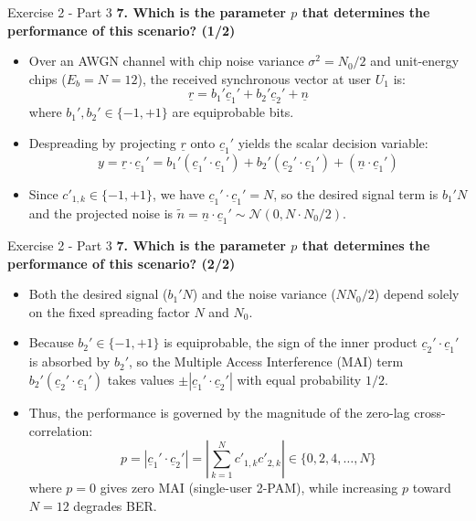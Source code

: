 \documentclass[10pt, aspectratio=169]{beamer}
\newcommand{\question}[1]{{\color{QuestionRed}\textbf{#1}}}
\begin{document}
	\begin{frame}{Exercise 2 - Part 3}
		\question{7. Which is the parameter $p$ that determines the performance of this scenario? (1/2)}
		
		\vspace{0.1cm}
		\begin{itemize}
			\item Over an AWGN channel with chip noise variance $\sigma^2 = N_0/2$ and unit-energy chips ($E_b = N = 12$), the received synchronous vector at user $U_1$ is:
			\[
			\underline{r} = b_1'\underline{c}_1' + b_2'\underline{c}_2' + \underline{n}
			\]
			where $b_1', b_2' \in \{-1, +1\}$ are equiprobable bits.
			\item Despreading by projecting $\underline{r}$ onto $\underline{c}_1'$ yields the scalar decision variable:
			\[
			y = \underline{r} \cdot \underline{c}_1' = b_1'(\underline{c}_1' \cdot \underline{c}_1') + b_2'(\underline{c}_2' \cdot \underline{c}_1') + (\underline{n} \cdot \underline{c}_1')
			\]
			\item Since $c'_{1,k} \in \{-1, +1\}$, we have $\underline{c}_1' \cdot \underline{c}_1' = N$, so the desired signal term is $b_1'N$ and the projected noise is $\tilde{n} = \underline{n} \cdot \underline{c}_1' \sim \mathcal{N}(0, N \cdot N_0/2)$.
		\end{itemize}
		
	\end{frame}
	
	\begin{frame}{Exercise 2 - Part 3}
		\question{7. Which is the parameter $p$ that determines the performance of this scenario? (2/2)}
		
		\vspace{0.1cm}
		\begin{itemize}
			\item Both the desired signal ($b_1'N$) and the noise variance ($N N_0/2$) depend solely on the fixed spreading factor $N$ and $N_0$.
			\item Because $b_2' \in \{-1, +1\}$ is equiprobable, the sign of the inner product $\underline{c}_2' \cdot \underline{c}_1'$ is absorbed by $b_2'$, so the Multiple Access Interference (MAI) term $b_2'(\underline{c}_2' \cdot \underline{c}_1')$ takes values $\pm |\underline{c}_1' \cdot \underline{c}_2'|$ with equal probability $1/2$.
			\item Thus, the performance is governed by the magnitude of the zero-lag cross-correlation:
			\[
			p = |\underline{c}_1' \cdot \underline{c}_2'| = \left|\sum_{k=1}^{N} c'_{1,k} c'_{2,k}\right| \in \{0, 2, 4, \dots, N\}
			\]
			where $p = 0$ gives zero MAI (single-user 2-PAM), while increasing $p$ toward $N = 12$ degrades BER.
		\end{itemize}
		
	\end{frame}
	
\end{document}
